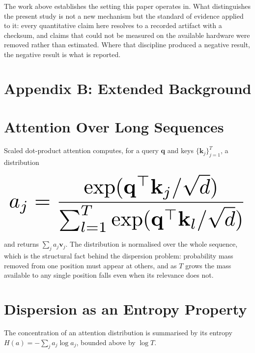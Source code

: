 \documentclass{article}
\begin{document}
The work above establishes the setting this paper operates in. What distinguishes the present study is not a new mechanism but the standard of evidence applied to it: every quantitative claim here resolves to a recorded artifact with a checksum, and claims that could not be measured on the available hardware were removed rather than estimated. Where that discipline produced a negative result, the negative result is what is reported.




\section{Appendix B: Extended Background}



\section{Attention Over Long Sequences}


Scaled dot-product attention computes, for a query $\mathbf{q}$ and keys $\{\mathbf{k}_j\}_{j=1}^{T}$, a distribution







\begin{equation}
\resizebox{\columnwidth}{!}{$\displaystyle
\begin{aligned}
a_j = \frac{\exp(\mathbf{q}^{\top}\mathbf{k}_j / \sqrt{d})}{\sum_{l=1}^{T} \exp(\mathbf{q}^{\top}\mathbf{k}_l / \sqrt{d})}
\end{aligned}
$}
\end{equation}







and returns $\sum_j a_j \mathbf{v}_j$. The distribution is normalised over the whole sequence, which is the structural fact behind the dispersion problem: probability mass removed from one position must appear at others, and as $T$ grows the mass available to any single position falls even when its relevance does not.


\section{Dispersion as an Entropy Property}


The concentration of an attention distribution is summarised by its entropy $H(a) = -\sum_j a_j \log a_j$, bounded above by $\log T$.
\end{document}
